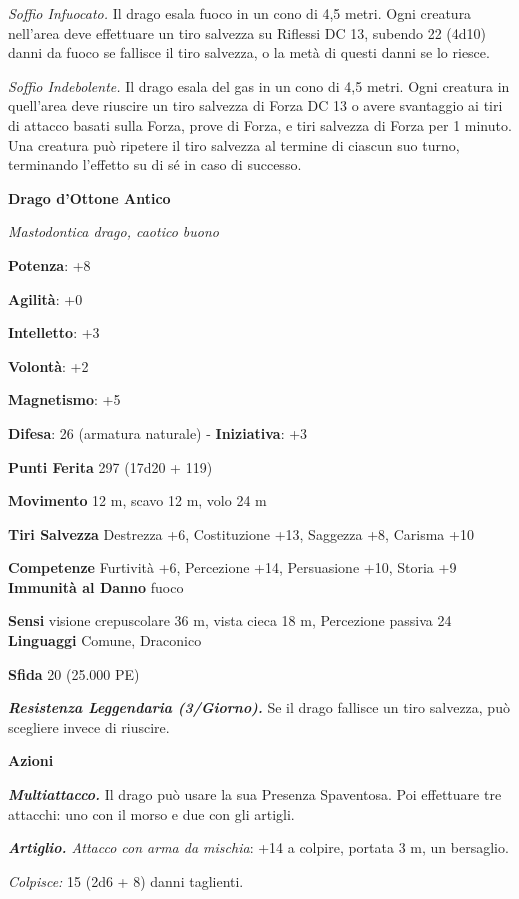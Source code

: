 \begin{multicols}{2}
\emph{Soffio Infuocato.} Il drago esala fuoco in un cono di 4,5 metri.
Ogni creatura nell'area deve effettuare un tiro salvezza su Riflessi DC
13, subendo 22 (4d10) danni da fuoco se fallisce il tiro salvezza, o la
metà di questi danni se lo riesce.

\emph{Soffio Indebolente.} Il drago esala del gas in un cono di 4,5
metri. Ogni creatura in quell'area deve riuscire un tiro salvezza di Forza DC 13 o avere svantaggio ai tiri di attacco basati sulla Forza,
prove di Forza, e tiri salvezza di Forza per 1 minuto. Una creatura può
ripetere il tiro salvezza al termine di ciascun suo turno, terminando
l'effetto su di sé in caso di successo.



\textbf{Drago d'Ottone Antico}

\emph{Mastodontica drago, caotico buono}

\textbf{Potenza}: +8

\textbf{Agilità}: +0

\textbf{Intelletto}: +3

\textbf{Volontà}: +2

\textbf{Magnetismo}: +5

\textbf{Difesa}: 26 (armatura naturale) - \textbf{Iniziativa}: +3

\textbf{Punti Ferita} 297 (17d20 + 119)

\textbf{Movimento} 12 m, scavo 12 m, volo 24 m

\textbf{Tiri Salvezza} Destrezza +6, Costituzione +13, Saggezza +8,
Carisma +10

\textbf{Competenze} Furtività +6, Percezione +14, Persuasione +10, Storia
+9 \textbf{Immunità al Danno} fuoco

\textbf{Sensi} visione crepuscolare 36 m, vista cieca 18 m, Percezione passiva
24 \textbf{Linguaggi} Comune, Draconico

\textbf{Sfida} 20 (25.000 PE)\smallskip

\emph{\textbf{Resistenza Leggendaria (3/Giorno).}} Se il drago fallisce
un tiro salvezza, può scegliere invece di riuscire.

\smallskip\textbf{Azioni}

\emph{\textbf{Multiattacco.}} Il drago può usare la sua Presenza
Spaventosa. Poi effettuare tre attacchi: uno con il morso e due con gli
artigli.

\emph{\textbf{Artiglio.} Attacco con arma da mischia}: +14 a colpire,
portata 3 m, un bersaglio.

\emph{Colpisce:} 15 (2d6 + 8) danni taglienti.


\end{multicols}
